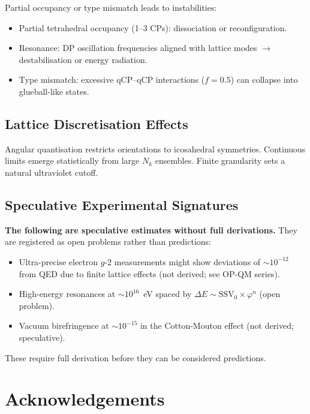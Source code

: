 \documentclass[11pt]{article}
\begin{document}
Partial occupancy or type mismatch leads to instabilities:
\begin{itemize}
\item Partial tetrahedral occupancy (1--3 CPs): dissociation or reconfiguration.
\item Resonance: DP oscillation frequencies aligned with lattice modes
  $\to$ destabilisation or energy radiation.
\item Type mismatch: excessive qCP--qCP interactions ($f=0.5$) can collapse
  into glueball-like states.
\end{itemize}

\subsection{Lattice Discretisation Effects}

Angular quantisation restricts orientations to icosahedral symmetries.
Continuous limits emerge statistically from large $N_k$ ensembles.
Finite granularity sets a natural ultraviolet cutoff.

\subsection{Speculative Experimental Signatures}

\textbf{The following are speculative estimates without full derivations.}
They are registered as open problems rather than predictions:
\begin{itemize}
\item Ultra-precise electron $g$-2 measurements might show deviations of
  ${\sim}10^{-12}$ from QED due to finite lattice effects (not derived;
  see OP-QM series).
\item High-energy resonances at ${\sim}10^{16}$~eV spaced by
  $\Delta E \sim \text{SSV}_0 \times \varphi^n$ (open problem).
\item Vacuum birefringence at ${\sim}10^{-15}$ in the Cotton-Mouton
  effect (not derived; speculative).
\end{itemize}

These require full derivation before they can be considered predictions.

\section*{Acknowledgements}
\end{document}
